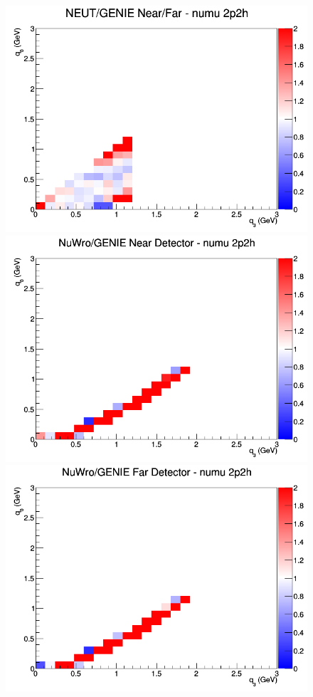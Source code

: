 \begin{figure}[h]
\endminipage
{}
\includegraphics[width=\linewidth]{q0_q3/nominal/ratios/2p2h_NEUT_GENIE_numu_NF_q3_q0.png}
\endminipage
\newline
{}
\includegraphics[width=\linewidth]{q0_q3/nominal/ratios/2p2h_NuWro_GENIE_numu_near_q3_q0.png}
\endminipage
{}
\includegraphics[width=\linewidth]{q0_q3/nominal/ratios/2p2h_NuWro_GENIE_numu_far_q3_q0.png}

\end{figure}
